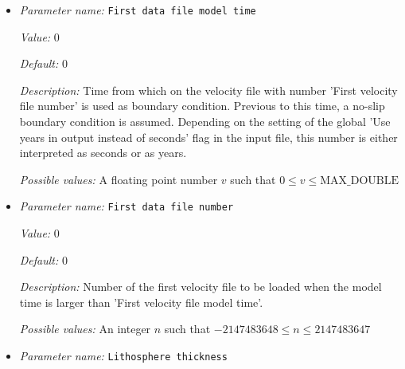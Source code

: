 \begin{itemize}
{\it Value:} false


{\it Default:} false


{\it Description:} In some cases the boundary files are not numbered in increasing but in decreasing order (e.g. 'Ma BP'). If this flag is set to 'True' the plugin will first load the file with the number 'First velocity file number' and decrease the file number during the model run.


{\it Possible values:} A boolean value (true or false)
\item {\it Parameter name:} {\tt First data file model time}
\label{parameters:Boundary velocity model/GPlates model/First data file model time}
\label{parameters:Boundary_20velocity_20model/GPlates_20model/First_20data_20file_20model_20time}


{\it Value:} 0


{\it Default:} 0


{\it Description:} Time from which on the velocity file with number 'First velocity file number' is used as boundary condition. Previous to this time, a no-slip boundary condition is assumed. Depending on the setting of the global 'Use years in output instead of seconds' flag in the input file, this number is either interpreted as seconds or as years.


{\it Possible values:} A floating point number $v$ such that $0 \leq v \leq \text{MAX\_DOUBLE}$
\item {\it Parameter name:} {\tt First data file number}
\label{parameters:Boundary velocity model/GPlates model/First data file number}
\label{parameters:Boundary_20velocity_20model/GPlates_20model/First_20data_20file_20number}


{\it Value:} 0


{\it Default:} 0


{\it Description:} Number of the first velocity file to be loaded when the model time is larger than 'First velocity file model time'.


{\it Possible values:} An integer $n$ such that $-2147483648\leq n \leq 2147483647$
\item {\it Parameter name:} {\tt Lithosphere thickness}
\label{parameters:Boundary velocity model/GPlates model/Lithosphere thickness}
\label{parameters:Boundary_20velocity_20model/GPlates_20model/Lithosphere_20thickness}



\end{itemize}

